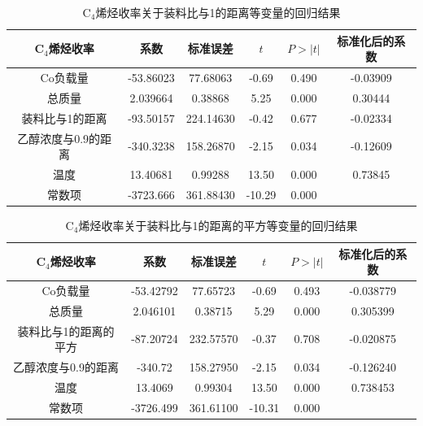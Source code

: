 \documentclass[a4paper,10.5pt]{ctexart}
\begin{document}
\begin{table}[htbp]
  \centering
  \caption{C$_4$烯烃收率关于装料比与1的距离等变量的回归结果}
    \begin{tabular}{cccccc}
    \toprule[2pt]
    C$_4$烯烃收率 & 系数    & 标准误差 & $t$ & $P>|t|$ &标准化后的系数 \\
    \midrule
    Co负载量 & -53.86023 & 77.68063  & -0.69 & 0.490 & -0.03909  \\
    总质量   & 2.039664  & 0.38868  & 5.25  & 0.000 & 0.30444  \\
    装料比与1的距离 & -93.50157 & 224.14630  & -0.42 & 0.677 & -0.02334  \\
    乙醇浓度与0.9的距离 & -340.3238 & 158.26870  & -2.15 & 0.034 & -0.12609  \\
    温度    & 13.40681  & 0.99288  & 13.50 & 0.000 & 0.73845  \\
    常数项   & -3723.666 & 361.88430  & -10.29 & 0.000 &  \\
    \bottomrule[2pt]
    \end{tabular}%
  \label{tab:addlabel}%
\end{table}%
\begin{table}[htbp]
  \centering
  \caption{C$_4$烯烃收率关于装料比与1的距离的平方等变量的回归结果}
    \begin{tabular}{cccccc}
    \toprule[2pt]
    C$_4$烯烃收率 & 系数    & 标准误差   & $t$ & $P>|t|$ &标准化后的系数 \\
    \midrule
    Co负载量 & -53.42792 & 77.65723  & -0.69 & 0.493 & -0.038779  \\
    总质量   & 2.046101  & 0.38715  & 5.29  & 0.000 & 0.305399  \\
    装料比与1的距离的平方 & -87.20724 & 232.57570  & -0.37 & 0.708 & -0.020875  \\
    乙醇浓度与0.9的距离 & -340.72 & 158.27950  & -2.15 & 0.034 & -0.126240  \\
    温度    & 13.4069  & 0.99304  & 13.50 & 0.000 & 0.738453  \\
    常数项   & -3726.499 & 361.61100  & -10.31 & 0.000 &  \\
    \bottomrule[2pt]
    \end{tabular}%
  \label{tab:addlabel}%
\end{table}%
\end{document}
